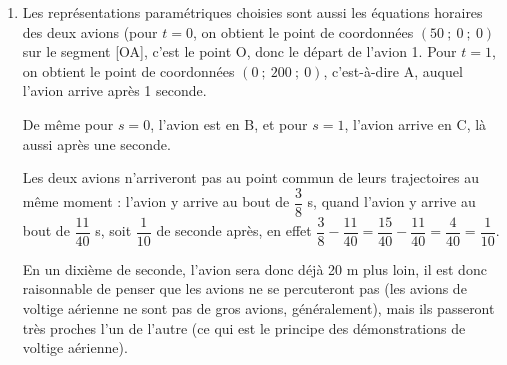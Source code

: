\begin{enumerate}
$\begin{aligned} \begin{cases}	0 = -33 + 120s\\200t = 75\\0 = 44 - 160s\end{cases}
&\iff \begin{cases}	120s = 33\\t = \dfrac{75}{200}\\160s = 44\end{cases}\\
&\iff \begin{cases}	s = \dfrac{33}{120}\\t = \dfrac{3}{8}\\s = \dfrac{44}{160}\end{cases} \\
&\iff \begin{cases}	s = \dfrac{11}{40}\\t = \dfrac{3}{8}\\s = \dfrac{11}{40}\end{cases} \\ \end{aligned}$

Le système a effectivement une unique solution, les deux trajectoires ont donc bien un point commun, qui est le point de paramètre $t = \dfrac{3}{8}$ sur [0A], qui est aussi le point de paramètre $s = \dfrac{11}{40}$ sur [BC], c'est le point de coordonnées $(0~;~75~;~0)$.


\item Les représentations paramétriques choisies sont aussi les équations horaires des deux avions (pour $t = 0$, on obtient le point de coordonnées $(50~;~0~;~0)$ sur le segment [OA], c'est le point O, donc le départ de l'avion 1. Pour $t = 1$, on obtient le point de coordonnées $(0~;~200~;~0)$, c'est-à-dire A, auquel l'avion arrive après 1 seconde.

De même pour $s = 0$, l'avion  est en B, et pour $s=1$, l'avion arrive en C, là aussi après une seconde.

Les deux avions n'arriveront pas au point commun de leurs trajectoires au même moment : l'avion  y arrive au bout de $\dfrac{3}{8}$ s, quand l'avion  y arrive au bout de $\dfrac{11}{40}$ s, soit $\dfrac{1}{10}$ de seconde après, en effet $\dfrac{3}{8} - \dfrac{11}{40} = \dfrac{15}{40} - \dfrac{11}{40} = \dfrac{4}{40} = \dfrac{1}{10}$.

En un dixième de seconde, l'avion  sera donc déjà 20 m plus loin, il est donc raisonnable de penser que les avions ne se percuteront pas (les avions de voltige aérienne ne sont pas de gros avions, généralement), mais ils passeront très proches l'un de l'autre (ce qui est le principe des démonstrations de voltige aérienne).
\end{enumerate}

